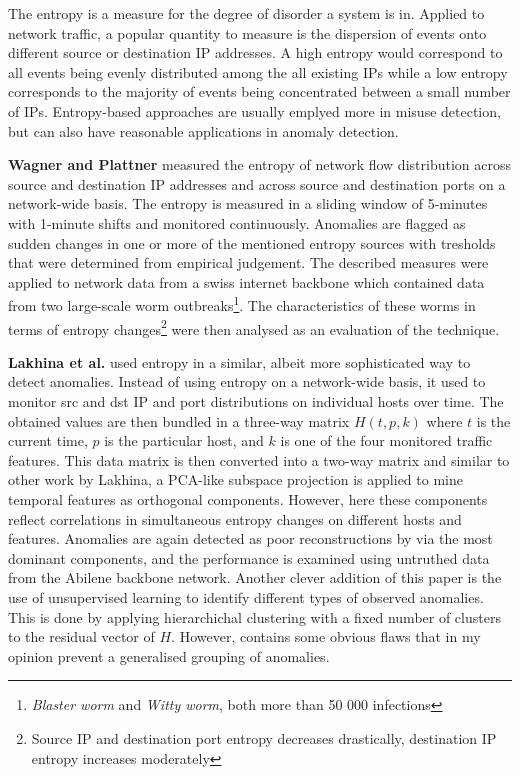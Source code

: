 \documentclass[a4paper,12pt,twoside]{report}
\begin{document}
The entropy is a measure for the degree of disorder a system is in. Applied to network traffic, a popular quantity to measure is the dispersion of events onto different source or destination IP addresses. A high entropy would correspond to all events being evenly distributed among the all existing IPs while a low entropy corresponds to the majority of events being concentrated between a small number of IPs.  Entropy-based approaches are usually emplyed more in misuse detection, but can also have reasonable applications in anomaly detection.

\textbf{Wagner and Plattner} \cite{wagner2005entropy} measured the entropy of network flow distribution across source and destination IP addresses and across source and destination ports on a network-wide basis. The entropy is measured in a sliding window of 5-minutes with 1-minute shifts and monitored continuously. Anomalies are flagged as sudden changes in one or more of the mentioned entropy sources with tresholds that were determined from empirical judgement. The described measures were applied to network data from a swiss internet backbone which contained data from two large-scale worm outbreaks\footnote{\textit{Blaster worm} and \textit{Witty worm}, both more than 50 000 infections}. The characteristics of these worms in terms of entropy changes\footnote{Source IP and destination port entropy decreases drastically, destination IP entropy increases moderately} were then analysed as an evaluation of the technique.

\textbf{Lakhina et al.} \cite{lakhina2005mining} used entropy in a similar, albeit more sophisticated way to detect anomalies. Instead of using entropy on a network-wide basis, it used to monitor src and dst IP and port distributions on individual hosts over time. The obtained values are then bundled in a three-way matrix $H(t,p,k)$ where $t$ is the current time, $p$ is the particular host, and $k$ is one of the four monitored traffic features. This data matrix is then converted into a two-way matrix and similar to other work by Lakhina, a PCA-like subspace projection is applied to mine temporal features as orthogonal components. However, here these components reflect correlations in simultaneous entropy changes on different hosts and features. Anomalies are again detected as poor reconstructions by via the most dominant components, and the performance is examined using untruthed data from the Abilene backbone network. Another clever addition of this paper is the use of unsupervised learning to identify different types of observed anomalies. This is done by applying hierarchichal clustering with a fixed number of clusters to the residual vector of $H$. However, contains some obvious flaws that in my opinion prevent a generalised grouping of anomalies.
\end{document}
